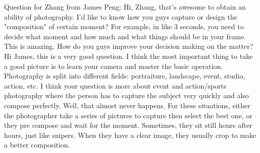 Question for Zhang from James Peng: Hi, Zhang, that's awesome to obtain an ability of photography. I'd like to know how you guys capture or design the "composition" of certain moment? For example, in like 3 seconds, you need to decide what moment and how much and what things should be in your frame. This is amazing. How do you guys improve your decision making on the matter? 
Hi James, this is a very good question. I think the most important thing to take a good picture is to learn your camera and master the basic operation. Photography is split into different fields: portraiture, landscape, event, studio, action, etc. I think your question is more about event and action/sports photography where the person has to capture the subject very quickly and also compose perfectly. Well, that almost never happens. For these situations, either the photographer take a series of pictures to capture then select the best one, or they pre compose and wait for the moment. Sometimes, they sit still hours after hours, just like snipers. When they have a clear image, they usually crop to make a better composition. 
